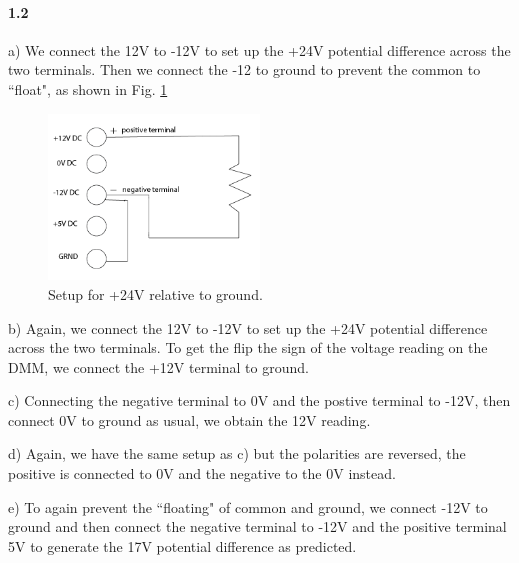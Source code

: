 \documentclass[authoryear, 12pt,5p, times]{elsarticle}
\begin{document}
\paragraph{\textbf{1.2}}
\par a)  We connect the 12V to -12V to set up the +24V potential difference across the two terminals. Then we connect the -12 to ground to prevent the common to ``float", as shown in Fig. \ref{24}
\begin{figure}[h!]
\center
\includegraphics[width=0.5\textwidth]{figure/parta}
\caption{Setup for +24V relative to ground.}
\label{24}
\end{figure}
\par  b)	Again, we connect the 12V to -12V to set up the +24V potential difference across the two terminals. To get the flip the sign of the voltage reading on the DMM, we connect the +12V terminal to ground.
\par  c) Connecting the negative  terminal to 0V and the postive terminal to -12V, then connect 0V to ground as usual, we obtain the 12V reading. 
\par  d)	Again, we have the same setup as c) but the polarities are reversed, the positive is connected to 0V and the negative to the 0V instead.
\par  e)	To again prevent the ``floating" of common and ground, we connect -12V to ground and then connect the negative terminal to -12V and the positive terminal 5V to generate the 17V potential difference as predicted.
\end{document}
